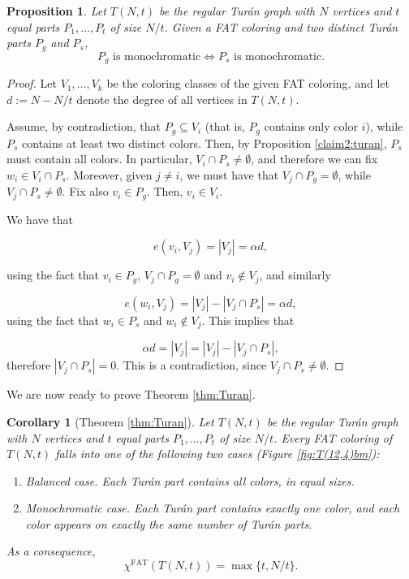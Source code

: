 \documentclass{article}
\theoremstyle{plain}
\newtheorem{proposition}[theorem]{Proposition}
\newtheorem*{corollary*}{Corollary}
\theoremstyle{definition}
\theoremstyle{remark}
\begin{document}
\begin{proposition}\label{claim3:turan}
Let $T(N,t)$ be the regular Turán graph with $N$ vertices and $t$ equal parts $P_1,\ldots,P_t$ of size $N/t$. Given a FAT coloring and two distinct Turán parts $P_g$ and $P_s$,
$$
P_g \text{ is monochromatic} \iff  P_s \text{ is monochromatic.}
$$
\end{proposition}

\begin{proof}Let $V_1,\ldots,V_k$ be the coloring classes of the given FAT coloring, and let $d:=N-N/t$ denote the degree of all vertices in $T(N,t)$.\newline 

Assume, by contradiction, that $P_g\subseteq V_i$ (that is, $P_g$ contains only color $i$), while $P_s$ contains at least two distinct colors. Then, by Proposition \ref{claim2:turan}, $P_s$ must contain all colors. In particular, $V_i \cap P_s \neq \emptyset$, and therefore we can fix $w_i \in V_i \cap P_s$. Moreover, given $j\neq i$, we must have that $V_j \cap P_g = \emptyset$, while $V_j \cap P_s \neq \emptyset$. Fix also $v_i\in P_g$. Then, $v_i\in V_i$.\newline 

We have that

$$ e(v_i,V_j)=|V_j|=\alpha d, $$ 

using the fact that $v_i\in P_g$, $V_j \cap P_g = \emptyset$ and $v_i\notin V_j$, and similarly

$$ e(w_i,V_j)=|V_j|-|V_j\cap P_s|=\alpha d, $$     using the fact that $w_i\in P_s$ and $w_i\notin V_j$. This implies that 

$$
\alpha d=|V_j|=|V_j|-|V_j\cap P_s|,
$$ therefore $|V_j\cap P_s|=0$. This is a contradiction, since $V_j \cap P_s \neq \emptyset$.

\end{proof}




We are now ready to prove Theorem \ref{thm:Turan}.

\begin{corollary*}[Theorem \ref{thm:Turan}]
   Let $T(N,t)$ be the regular Turán graph with $N$ vertices and $t$ equal parts $P_1,\ldots,P_t$ of size $N/t$. Every FAT coloring of $T(N,t)$ falls into one of the following two cases (Figure \ref{fig:T(12,4)bm}):
\begin{enumerate}
    \item \emph{Balanced case.} Each Turán part contains all colors, in equal sizes.
    \item \emph{Monochromatic case.} Each Turán part contains exactly one color, and each color appears on exactly the same number of Turán parts. 
\end{enumerate}
    As a consequence, $$\chi^{\textrm{FAT}}(T(N,t))=\max\{t,N/t\}.$$
\end{corollary*}
\end{document}
